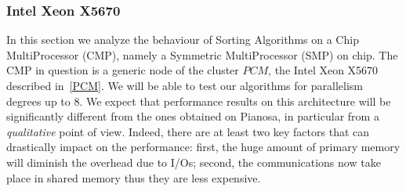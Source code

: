 \subsubsection{Intel Xeon X5670}
In this section we analyze the behaviour of Sorting Algorithms on a Chip MultiProcessor (CMP), namely a Symmetric MultiProcessor (SMP) on chip. The CMP in question is a generic node of the cluster $PCM$, the Intel Xeon X5670 described in~\ref{PCM}. We will be able to test our algorithms for parallelism degrees up to 8. We expect that performance results on this architecture will be significantly different from the ones obtained on Pianosa, in particular from a \textit{qualitative} point of view. Indeed, there are at least two key factors that can drastically impact on the performance: first, the huge amount of primary memory will diminish the overhead due to I/Os; second, the communications now take place in shared memory thus they are less expensive.


